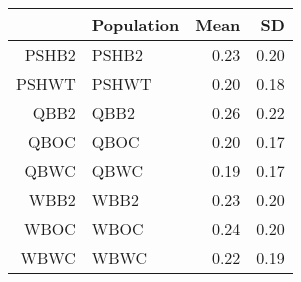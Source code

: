 \begin{tabular}{rlrr}
  \hline
 & Population & Mean & SD \\ 
  \hline
PSHB2 & PSHB2 & 0.23 & 0.20 \\ 
  PSHWT & PSHWT & 0.20 & 0.18 \\ 
  QBB2 & QBB2 & 0.26 & 0.22 \\ 
  QBOC & QBOC & 0.20 & 0.17 \\ 
  QBWC & QBWC & 0.19 & 0.17 \\ 
  WBB2 & WBB2 & 0.23 & 0.20 \\ 
  WBOC & WBOC & 0.24 & 0.20 \\ 
  WBWC & WBWC & 0.22 & 0.19 \\ 
   \hline
\end{tabular}
